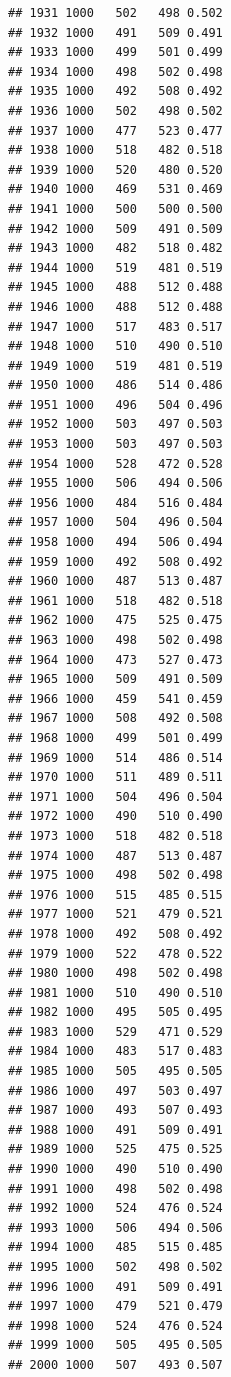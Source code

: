\documentclass[
]{book}
\newenvironment{Shaded}{\begin{snugshade}}{\end{snugshade}}
\newcommand{\FunctionTok}[1]{\textcolor[rgb]{0.00,0.00,0.00}{#1}}
\newcommand{\NormalTok}[1]{#1}
\newcommand{\SpecialCharTok}[1]{\textcolor[rgb]{0.00,0.00,0.00}{#1}}
\begin{document}
\begin{verbatim}
## 1931 1000   502   498 0.502
## 1932 1000   491   509 0.491
## 1933 1000   499   501 0.499
## 1934 1000   498   502 0.498
## 1935 1000   492   508 0.492
## 1936 1000   502   498 0.502
## 1937 1000   477   523 0.477
## 1938 1000   518   482 0.518
## 1939 1000   520   480 0.520
## 1940 1000   469   531 0.469
## 1941 1000   500   500 0.500
## 1942 1000   509   491 0.509
## 1943 1000   482   518 0.482
## 1944 1000   519   481 0.519
## 1945 1000   488   512 0.488
## 1946 1000   488   512 0.488
## 1947 1000   517   483 0.517
## 1948 1000   510   490 0.510
## 1949 1000   519   481 0.519
## 1950 1000   486   514 0.486
## 1951 1000   496   504 0.496
## 1952 1000   503   497 0.503
## 1953 1000   503   497 0.503
## 1954 1000   528   472 0.528
## 1955 1000   506   494 0.506
## 1956 1000   484   516 0.484
## 1957 1000   504   496 0.504
## 1958 1000   494   506 0.494
## 1959 1000   492   508 0.492
## 1960 1000   487   513 0.487
## 1961 1000   518   482 0.518
## 1962 1000   475   525 0.475
## 1963 1000   498   502 0.498
## 1964 1000   473   527 0.473
## 1965 1000   509   491 0.509
## 1966 1000   459   541 0.459
## 1967 1000   508   492 0.508
## 1968 1000   499   501 0.499
## 1969 1000   514   486 0.514
## 1970 1000   511   489 0.511
## 1971 1000   504   496 0.504
## 1972 1000   490   510 0.490
## 1973 1000   518   482 0.518
## 1974 1000   487   513 0.487
## 1975 1000   498   502 0.498
## 1976 1000   515   485 0.515
## 1977 1000   521   479 0.521
## 1978 1000   492   508 0.492
## 1979 1000   522   478 0.522
## 1980 1000   498   502 0.498
## 1981 1000   510   490 0.510
## 1982 1000   495   505 0.495
## 1983 1000   529   471 0.529
## 1984 1000   483   517 0.483
## 1985 1000   505   495 0.505
## 1986 1000   497   503 0.497
## 1987 1000   493   507 0.493
## 1988 1000   491   509 0.491
## 1989 1000   525   475 0.525
## 1990 1000   490   510 0.490
## 1991 1000   498   502 0.498
## 1992 1000   524   476 0.524
## 1993 1000   506   494 0.506
## 1994 1000   485   515 0.485
## 1995 1000   502   498 0.502
## 1996 1000   491   509 0.491
## 1997 1000   479   521 0.479
## 1998 1000   524   476 0.524
## 1999 1000   505   495 0.505
## 2000 1000   507   493 0.507
\end{verbatim}

\begin{Shaded}
\end{Shaded}
\end{document}
